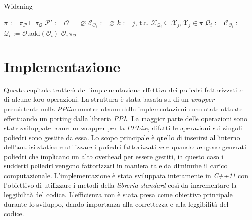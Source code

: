 \documentclass{mimosis}
\theoremstyle{definition}
\let\emptyset\varnothing
\begin{document}
\begin{algorithm}[H]
\caption{Widening}\label{widening}
\begin{algorithmic}[1]
\State $\pi$ := $\pi_{\mathcal{P}} \sqcup \pi_{\mathcal{Q}}$
\State $\mathcal{P}'$ := 
\State $\mathcal{O}$ := $\emptyset$
\State $\mathcal{C}_{\mathcal{O}_i}$ := $\emptyset$
\State $k$ := $j$, t.c. $\mathcal{X}_{\mathcal{Q}_i} \subseteq \mathcal{X}_j, \mathcal{X}_j \in \pi$
\State $\mathcal{Q}_i$ := 
\Else
\State $\mathcal{C}_{\mathcal{O}_i}$ := 
\State $\mathcal{Q}_i$ := 
\EndIf
\State $\mathcal{O}$.add$(\mathcal{O}_i)$
\EndFor
\State\Return $\mathcal{O}, \pi_{\mathcal{O}}$
\EndFunction
\end{algorithmic}
\end{algorithm}

\chapter{Implementazione}
\label{sec:orge4b3ee6}
Questo capitolo tratterà dell'implementazione effettiva dei poliedri
fattorizzati e di alcune loro operazioni. La struttura è stata basata su di un
\emph{wrapper} preesistente nella \emph{PPlite} mentre alcune delle implementazioni sono
state attuate effettuando un porting dalla libreria \emph{PPL}. La maggior parte delle
operazioni sono state sviluppate come un wrapper per la \emph{PPLite}, difatti le
operazioni sui singoli poliedri sono gestite da essa. Lo scopo principale è
quello di inserirsi all'interno dell'analisi statica e utilizzare i poliedri
fattorizzati se e quando vengono generati poliedri che implicano un alto
overhead per essere gestiti, in questo caso i suddetti poliedri vengono
fattorizzati in maniera tale da diminuire il carico computazionale.
L'implementazione è stata sviluppata interamente in \emph{C++11} con l'obiettivo di
utilizzare i metodi della \emph{libreria standard} così da incrementare la leggibilità
del codice. L'efficienza non è stata presa come obiettivo principale durante lo
sviluppo, dando importanza alla correttezza e alla leggibilità del codice.
\end{document}
